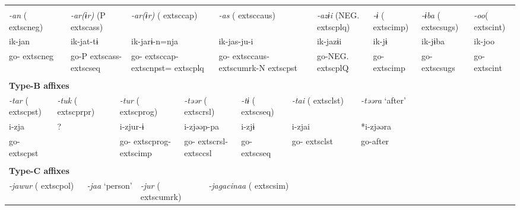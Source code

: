 \tabletail{}
\tablelasttail{}
\begin{tabularx}{\textwidth}{XXXXXXXXXXXXXXXXXXXX}
\lsptoprule
\multicolumn{20}{X}{{\bfseries Type-A affixes}}\\
\multicolumn{2}{X}{{ \textit{{}-an} (	extsc{neg})}} & \multicolumn{4}{X}{{ \textit{{}-ar(ɨr)} (P	extsc{ass})}} & \multicolumn{5}{X}{{ \textit{{}-ar(ɨr)} (	extsc{cap})}} & \multicolumn{4}{X}{{ \textit{{}-as} (	extsc{caus})}} & \multicolumn{2}{X}{{ \textit{{}-azɨi} (NEG.	extsc{plq})}} & { \textit{{}-ɨ} (	extsc{imp})} & { \textit{{}-ɨba} (	extsc{sugs})} & { \textit{{}-oo}(	extsc{int})}\\
\multicolumn{2}{X}{{ ik-jan}} & \multicolumn{4}{X}{{ ik-jat-tɨ}} & \multicolumn{5}{X}{{ ik-jarɨ-n=nja}} & \multicolumn{4}{X}{{ ik-jas-ju-i}} & \multicolumn{2}{X}{{ ik-jazɨi}} & { ik-jɨ} & { ik-jɨba} & { ik-joo}\\
\multicolumn{2}{X}{go-	extsc{neg}} & \multicolumn{4}{X}{go-P	extsc{ass}-	extsc{seq}} & \multicolumn{5}{X}{go-	extsc{cap}-	extsc{npst}=	extsc{plq}} & \multicolumn{4}{X}{go-	extsc{caus}-	extsc{umrk}-N	extsc{pst}} & \multicolumn{2}{X}{go-NEG.	extsc{pl}Q} & go-	extsc{imp} & go-	extsc{sugs} & go-	extsc{int}\\
\multicolumn{20}{X}{}\\
\multicolumn{20}{X}{{\bfseries Type-B affixes}}\\
{ \textit{{}-tar} (	extsc{pst})} & \multicolumn{4}{X}{{ \textit{{}-tuk} (	extsc{prpr})}} & \multicolumn{4}{X}{{ \textit{{}-tur} (	extsc{prog})}} & \multicolumn{4}{X}{{ \textit{{}-təər} (	extsc{rsl})}} & { \textit{{}-tɨ} (	extsc{seq})} & \multicolumn{2}{X}{{ \textit{{}-tai} (	extsc{lst})}} & \multicolumn{4}{X}{{ \textit{{}-təəra} ‘after’}}\\
{ i-zja} & \multicolumn{4}{X}{{ ?}} & \multicolumn{4}{X}{{ i-zjur-ɨ}} & \multicolumn{4}{X}{{ i-zjəəp-pa}} & { i-zjɨ} & \multicolumn{2}{X}{{ i-zjai}} & \multicolumn{4}{X}{{ *i-zjəəra}}\\
go-	extsc{pst} & \multicolumn{4}{X}{} & \multicolumn{4}{X}{go-	extsc{prog}-	extsc{imp}} & \multicolumn{4}{X}{go-	extsc{rsl}-	extsc{csl}} & go-	extsc{seq} & \multicolumn{2}{X}{go-	extsc{lst}} & \multicolumn{4}{X}{{ go-after}}\\
& \multicolumn{4}{X}{} & \multicolumn{4}{X}{} & \multicolumn{4}{X}{} &  & \multicolumn{2}{X}{} & \multicolumn{4}{X}{}\\
\multicolumn{20}{X}{{\bfseries Type-C affixes}}\\
\multicolumn{3}{X}{{ \textit{{}-jawur} (	extsc{pol})}} & \multicolumn{4}{X}{{ \textit{{}-jaa} ‘person’}} & \multicolumn{3}{X}{{ \textit{{}-jur} (	extsc{umrk})}} & \multicolumn{10}{X}{{ \textit{{}-jagacinaa} (	extsc{sim})}}\\

\end{tabularx}
